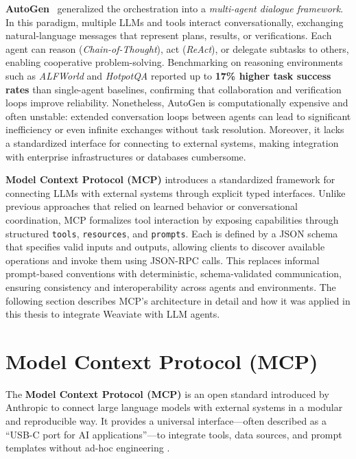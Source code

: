 \textbf{AutoGen}~\cite{wu2023autogen} generalized the orchestration into a \emph{multi-agent dialogue framework}.  
In this paradigm, multiple LLMs and tools interact conversationally, exchanging natural-language messages that represent plans, results, or verifications.  
Each agent can reason (\emph{Chain-of-Thought}), act (\emph{ReAct}), or delegate subtasks to others, enabling cooperative problem-solving.  
Benchmarking on reasoning environments such as \textit{ALFWorld} and \textit{HotpotQA} reported up to \textbf{17\% higher task success rates} than single-agent baselines, confirming that collaboration and verification loops improve reliability.  
Nonetheless, AutoGen is computationally expensive and often unstable: extended conversation loops between agents can lead to significant inefficiency or even infinite exchanges without task resolution.  
Moreover, it lacks a standardized interface for connecting to external systems, making integration with enterprise infrastructures or databases cumbersome.

\textbf{Model Context Protocol (MCP)} introduces a standardized framework for connecting LLMs with external systems through explicit typed interfaces.  
Unlike previous approaches that relied on learned behavior or conversational coordination, MCP formalizes tool interaction by exposing capabilities through structured \texttt{tools}, \texttt{resources}, and \texttt{prompts}.  
Each is defined by a JSON schema that specifies valid inputs and outputs, allowing clients to discover available operations and invoke them using JSON-RPC calls.  
This replaces informal prompt-based conventions with deterministic, schema-validated communication, ensuring consistency and interoperability across agents and environments.  
The following section describes MCP’s architecture in detail and how it was applied in this thesis to integrate Weaviate with LLM agents.


\section{Model Context Protocol (MCP)}

The \textbf{Model Context Protocol (MCP)} is an open standard introduced by Anthropic to connect large language models with external systems in a modular and reproducible way. It provides a universal interface---often described as a ``USB-C port for AI applications''---to integrate tools, data sources, and prompt templates without ad-hoc engineering \cite{mcp-intro}.

